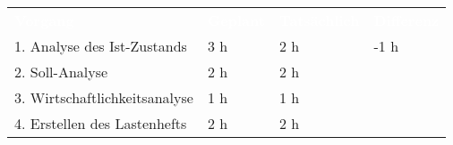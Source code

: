 \begin{tabularx}{\textwidth}{Xlll}
\rowcolor{heading}\textcolor{white}{\textbf{Vorgang}} & \textcolor{white}{\textbf{Geplant}} & \textcolor{white}{\textbf{Tatsächlich}} & \textcolor{white}{\textbf{Differenz}} \\
1. Analyse des Ist-Zustands & 3 h   & 2 h   & -1 h \\
\rowcolor{odd}2. Soll-Analyse  & 2 h   & 2 h   &   \\
3. Wirtschaftlichkeitsanalyse & 1 h   & 1 h   &  \\
\rowcolor{odd}4. Erstellen des Lastenhefts & 2 h   & 2 h   &  \\
\end{tabularx}
